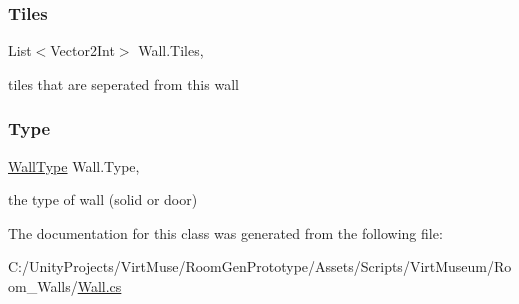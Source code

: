 \subsubsection{\texorpdfstring{Tiles}{Tiles}}
{\footnotesize\ttfamily List$<$Vector2\+Int$>$ Wall.\+Tiles\hspace{0.3cm}{\ttfamily [get]}, {}}



tiles that are seperated from this wall 

\mbox{\label{class_wall_ade4c1924f35fd33637a3cdfa31566af0}} 
\subsubsection{\texorpdfstring{Type}{Type}}
{\footnotesize\ttfamily \mbox{\hyperlink{class_wall_a1366d94ac70428624a6703d7db89638d}{Wall\+Type}} Wall.\+Type\hspace{0.3cm}{\ttfamily [get]}, {}}



the type of wall (solid or door) 



The documentation for this class was generated from the following file\+:\begin{DoxyCompactItemize}
\item 
C\+:/\+Unity\+Projects/\+Virt\+Muse/\+Room\+Gen\+Prototype/\+Assets/\+Scripts/\+Virt\+Museum/\+Room\+\_\+\+Walls/\mbox{\hyperlink{_wall_8cs}{Wall.\+cs}}\end{DoxyCompactItemize}
